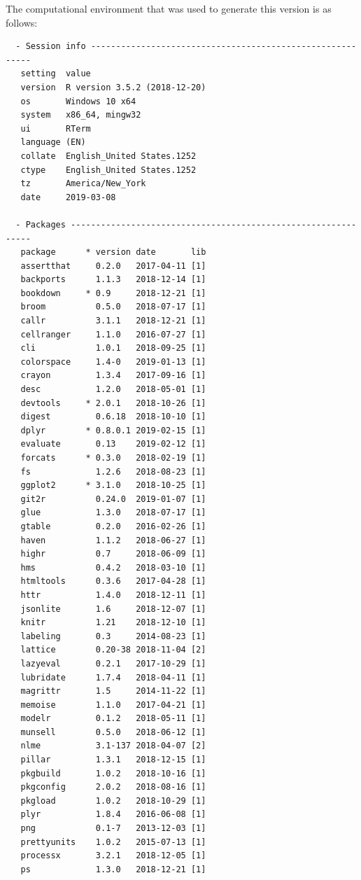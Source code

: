\documentclass[ms]{uncgdissertationexp}
\theoremstyle{plain}
\theoremstyle{definition}
\theoremstyle{remark}
\begin{document}
  The computational environment that was used to generate this version is
  as follows:
  \begin{verbatim}
  - Session info ----------------------------------------------------------
   setting  value                       
   version  R version 3.5.2 (2018-12-20)
   os       Windows 10 x64              
   system   x86_64, mingw32             
   ui       RTerm                       
   language (EN)                        
   collate  English_United States.1252  
   ctype    English_United States.1252  
   tz       America/New_York            
   date     2019-03-08                  
  
  - Packages --------------------------------------------------------------
   package      * version date       lib
   assertthat     0.2.0   2017-04-11 [1]
   backports      1.1.3   2018-12-14 [1]
   bookdown     * 0.9     2018-12-21 [1]
   broom          0.5.0   2018-07-17 [1]
   callr          3.1.1   2018-12-21 [1]
   cellranger     1.1.0   2016-07-27 [1]
   cli            1.0.1   2018-09-25 [1]
   colorspace     1.4-0   2019-01-13 [1]
   crayon         1.3.4   2017-09-16 [1]
   desc           1.2.0   2018-05-01 [1]
   devtools     * 2.0.1   2018-10-26 [1]
   digest         0.6.18  2018-10-10 [1]
   dplyr        * 0.8.0.1 2019-02-15 [1]
   evaluate       0.13    2019-02-12 [1]
   forcats      * 0.3.0   2018-02-19 [1]
   fs             1.2.6   2018-08-23 [1]
   ggplot2      * 3.1.0   2018-10-25 [1]
   git2r          0.24.0  2019-01-07 [1]
   glue           1.3.0   2018-07-17 [1]
   gtable         0.2.0   2016-02-26 [1]
   haven          1.1.2   2018-06-27 [1]
   highr          0.7     2018-06-09 [1]
   hms            0.4.2   2018-03-10 [1]
   htmltools      0.3.6   2017-04-28 [1]
   httr           1.4.0   2018-12-11 [1]
   jsonlite       1.6     2018-12-07 [1]
   knitr          1.21    2018-12-10 [1]
   labeling       0.3     2014-08-23 [1]
   lattice        0.20-38 2018-11-04 [2]
   lazyeval       0.2.1   2017-10-29 [1]
   lubridate      1.7.4   2018-04-11 [1]
   magrittr       1.5     2014-11-22 [1]
   memoise        1.1.0   2017-04-21 [1]
   modelr         0.1.2   2018-05-11 [1]
   munsell        0.5.0   2018-06-12 [1]
   nlme           3.1-137 2018-04-07 [2]
   pillar         1.3.1   2018-12-15 [1]
   pkgbuild       1.0.2   2018-10-16 [1]
   pkgconfig      2.0.2   2018-08-16 [1]
   pkgload        1.0.2   2018-10-29 [1]
   plyr           1.8.4   2016-06-08 [1]
   png            0.1-7   2013-12-03 [1]
   prettyunits    1.0.2   2015-07-13 [1]
   processx       3.2.1   2018-12-05 [1]
   ps             1.3.0   2018-12-21 [1]

\end{verbatim}
\end{document}
